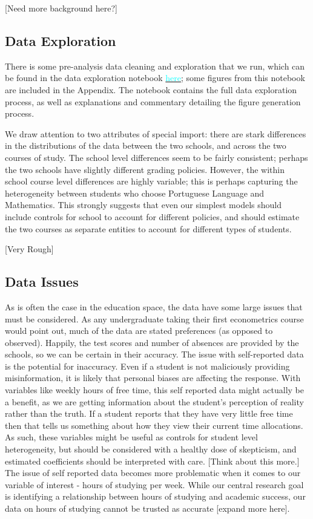 \documentclass[12pt]{article}
\begin{document}
\textcolor{BrickRed}{[Need more background here?]}

\subsection{Data Exploration}
There is some pre-analysis data cleaning and exploration that we run, which can be found in the data exploration notebook \href{https://github.com/nadavtadelis/Reproducible_Metrics/blob/master/data_exploration.ipynb}{\textcolor{cyan}{here}}; some figures from this notebook are included in the Appendix. The notebook contains the full data exploration process, as well as explanations and commentary detailing the figure generation process.

We draw attention to two attributes of special import: there are stark differences in the distributions of the data between the two schools, and across the two courses of study. The school level differences seem to be fairly consistent; perhaps the two schools have slightly different grading policies. However, the within school course level differences are highly variable; this is perhaps capturing the heterogeneity between students who choose Portuguese Language and Mathematics. This strongly suggests that even our simplest models should include controls for school to account for different policies, and should estimate the two courses as separate entities to account for different types of students.

\textcolor{BrickRed}{[Very Rough]}

\subsection{Data Issues}
As is often the case in the education space, the data have some large issues that must be considered. As any undergraduate taking their first econometrics course would point out, much of the data are stated preferences (as opposed to observed). Happily, the test scores and number of absences are provided by the schools, so we can be certain in their accuracy. The issue with self-reported data is the potential for inaccuracy. Even if a student is not maliciously providing misinformation, it is likely that personal biases are affecting the response. With variables like weekly hours of free time, this self reported data might actually be a benefit, as we are getting information about the student's perception of reality rather than the truth. If a student reports that they have very little free time then that tells us something about how they view their current time allocations. As such, these variables might be useful as controls for student level heterogeneity, but should be considered with a healthy dose of skepticism, and estimated coefficients should be interpreted with care. \textcolor{BrickRed}{[Think about this more.]} The issue of self reported data becomes more problematic when it comes to our variable of interest - hours of studying per week. While our central research goal is identifying a relationship between hours of studying and academic success, our data on hours of studying cannot be trusted as accurate \textcolor{BrickRed}{[expand more here]}.
\end{document}
